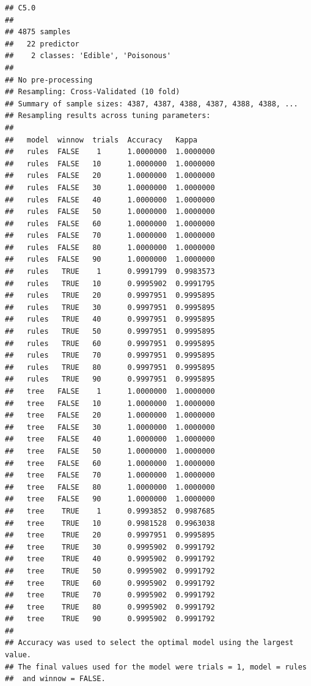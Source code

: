 \documentclass[10pt  ,usenames, dvipsnames]{article}\usepackage[]{graphicx}\usepackage[]{color}
\makeatletter
\newenvironment{kframe}{%
 \def\at@end@of@kframe{}%
 \ifinner\ifhmode%
  \def\at@end@of@kframe{\end{minipage}}%
  \begin{minipage}{\columnwidth}%
 \fi\fi%
 \def\FrameCommand##1{\hskip\@totalleftmargin \hskip-\fboxsep
 \colorbox{shadecolor}{##1}\hskip-\fboxsep
     \hskip-\linewidth \hskip-\@totalleftmargin \hskip\columnwidth}%
 \MakeFramed {\advance\hsize-\width
   \@totalleftmargin\z@ \linewidth\hsize
   \@setminipage}}%
 {\par\unskip\endMakeFramed%
 \at@end@of@kframe}
\newenvironment{knitrout}{}{} %
\makeatother
\begin{document}
\begin{knitrout}
\color{fgcolor}\begin{kframe}
\begin{verbatim}
## C5.0 
## 
## 4875 samples
##   22 predictor
##    2 classes: 'Edible', 'Poisonous' 
## 
## No pre-processing
## Resampling: Cross-Validated (10 fold) 
## Summary of sample sizes: 4387, 4387, 4388, 4387, 4388, 4388, ... 
## Resampling results across tuning parameters:
## 
##   model  winnow  trials  Accuracy   Kappa    
##   rules  FALSE    1      1.0000000  1.0000000
##   rules  FALSE   10      1.0000000  1.0000000
##   rules  FALSE   20      1.0000000  1.0000000
##   rules  FALSE   30      1.0000000  1.0000000
##   rules  FALSE   40      1.0000000  1.0000000
##   rules  FALSE   50      1.0000000  1.0000000
##   rules  FALSE   60      1.0000000  1.0000000
##   rules  FALSE   70      1.0000000  1.0000000
##   rules  FALSE   80      1.0000000  1.0000000
##   rules  FALSE   90      1.0000000  1.0000000
##   rules   TRUE    1      0.9991799  0.9983573
##   rules   TRUE   10      0.9995902  0.9991795
##   rules   TRUE   20      0.9997951  0.9995895
##   rules   TRUE   30      0.9997951  0.9995895
##   rules   TRUE   40      0.9997951  0.9995895
##   rules   TRUE   50      0.9997951  0.9995895
##   rules   TRUE   60      0.9997951  0.9995895
##   rules   TRUE   70      0.9997951  0.9995895
##   rules   TRUE   80      0.9997951  0.9995895
##   rules   TRUE   90      0.9997951  0.9995895
##   tree   FALSE    1      1.0000000  1.0000000
##   tree   FALSE   10      1.0000000  1.0000000
##   tree   FALSE   20      1.0000000  1.0000000
##   tree   FALSE   30      1.0000000  1.0000000
##   tree   FALSE   40      1.0000000  1.0000000
##   tree   FALSE   50      1.0000000  1.0000000
##   tree   FALSE   60      1.0000000  1.0000000
##   tree   FALSE   70      1.0000000  1.0000000
##   tree   FALSE   80      1.0000000  1.0000000
##   tree   FALSE   90      1.0000000  1.0000000
##   tree    TRUE    1      0.9993852  0.9987685
##   tree    TRUE   10      0.9981528  0.9963038
##   tree    TRUE   20      0.9997951  0.9995895
##   tree    TRUE   30      0.9995902  0.9991792
##   tree    TRUE   40      0.9995902  0.9991792
##   tree    TRUE   50      0.9995902  0.9991792
##   tree    TRUE   60      0.9995902  0.9991792
##   tree    TRUE   70      0.9995902  0.9991792
##   tree    TRUE   80      0.9995902  0.9991792
##   tree    TRUE   90      0.9995902  0.9991792
## 
## Accuracy was used to select the optimal model using the largest value.
## The final values used for the model were trials = 1, model = rules
##  and winnow = FALSE.
\end{verbatim}
\end{kframe}
\end{knitrout}
\end{document}
